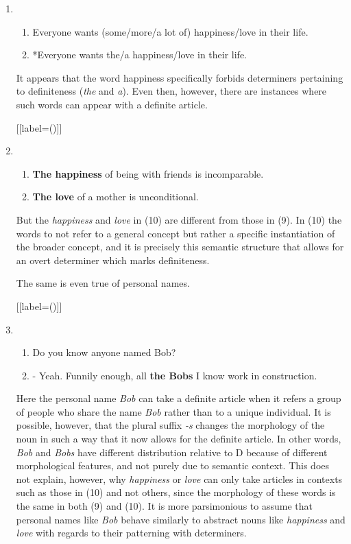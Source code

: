 \documentclass[12pt]{article}
\begin{document}
\begin{enumerate}[label=\textbf{\arabic*.}]
\begin{enumerate}[label=(\arabic*)]
[{[label=(\arabic*)]}]
\item
\begin{enumerate}[label=\alph*.]
\item Everyone wants (some/more/a lot of) happiness/love in their life.
\item *Everyone wants the/a happiness/love in their life.
\end{enumerate}

It appears that the word happiness specifically forbids determiners pertaining to definiteness (\emph{the} and \emph{a}). Even then, however, there are instances where such words can appear with a definite article.

[{[label=(\arabic*)]}]
\item
\begin{enumerate}[label=\alph*.]
\item \textbf{The happiness} of being with friends is incomparable.
\item \textbf{The love} of a mother is unconditional.
\end{enumerate}

But the \emph{happiness} and \emph{love} in (10) are different from those in (9). In (10) the words to not refer to a general concept but rather a specific instantiation of the broader concept, and it is precisely this semantic structure that allows for an overt determiner which marks definiteness.

The same is even true of personal names.

[{[label=(\arabic*)]}]
\item
\begin{enumerate}[label=\alph*.]
\item Do you know anyone named Bob?
\item \quad - Yeah. Funnily enough, all \textbf{the Bobs} I know work in construction.
\end{enumerate}

Here the personal name \emph{Bob} can take a definite article when it refers a group of people who share the name \emph{Bob} rather than to a unique individual. It is possible, however, that the plural suffix \emph{-s} changes the morphology of the noun in such a way that it now allows for the definite article. In other words, \emph{Bob} and \emph{Bobs} have different distribution relative to D because of different morphological features, and not purely due to semantic context. This does not explain, however, why \emph{happiness} or \emph{love} can only take articles in contexts such as those in (10) and not others, since the morphology of these words is the same in both (9) and (10). It is more parsimonious to assume that personal names like \emph{Bob} behave similarly to abstract nouns like \emph{happiness} and \emph{love} with regards to their patterning with determiners.


\end{enumerate}
\end{enumerate}
\end{document}
